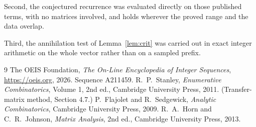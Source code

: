\documentclass[11pt,a4paper]{article}
\theoremstyle{plain}
\theoremstyle{definition}
\begin{document}
Second, the conjectured recurrence was evaluated directly on those published terms, with no
matrices involved, and holds wherever the proved range and the data overlap.

Third, the annihilation test of Lemma~\ref{lem:crit} was carried out in exact integer
arithmetic on the whole vector rather than on a sampled prefix.

\begin{thebibliography}{9}
 The OEIS Foundation, \emph{The On-Line Encyclopedia of Integer
Sequences}, \url{https://oeis.org}, 2026. Sequence A211459.
 R.~P.~Stanley, \emph{Enumerative Combinatorics}, Volume 1, 2nd ed.,
Cambridge University Press, 2011. (Transfer-matrix method, Section 4.7.)
 P.~Flajolet and R.~Sedgewick, \emph{Analytic Combinatorics}, Cambridge
University Press, 2009.
 R.~A.~Horn and C.~R.~Johnson, \emph{Matrix Analysis}, 2nd ed., Cambridge
University Press, 2013.
\end{thebibliography}
\end{document}
